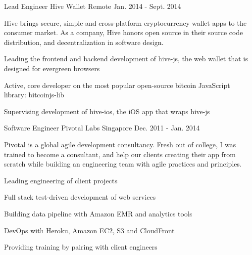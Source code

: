 \begin{cventries}
  \cventry
    {Lead Engineer} %
    {Hive Wallet} %
    {Remote} %
    {Jan. 2014 - Sept. 2014} %
    {
      Hive brings secure, simple and cross-platform cryptocurrency wallet apps to the consumer market. As a company, Hive honors open source in their source code distribution, and decentralization in software design.
      \begin{cvitems} %
        \item Leading the frontend and backend development of hive-js, the web wallet that is designed for evergreen browsers
        \item Active, core developer on the most popular open-source bitcoin JavaScript library: bitcoinjs-lib
        \item Supervising development of hive-ios, the iOS app that wraps hive-js
      \end{cvitems}
    }

  \cventry
    {Software Engineer} %
    {Pivotal Labs} %
    {Singapore} %
    {Dec. 2011 - Jan. 2014} %
    {
      Pivotal is a global agile development consultancy. Fresh out of college, I was trained to become a consultant, and help our clients creating their app from scratch while building an engineering team with agile practices and principles.
      \begin{cvitems} %
        \item Leading engineering of client projects
        \item Full stack test-driven development of web services
        \item Building data pipeline with Amazon EMR and analytics tools
        \item DevOps with Heroku, Amazon EC2, S3 and CloudFront
        \item Providing training by pairing with client engineers
      \end{cvitems}
    }
\end{cventries}
